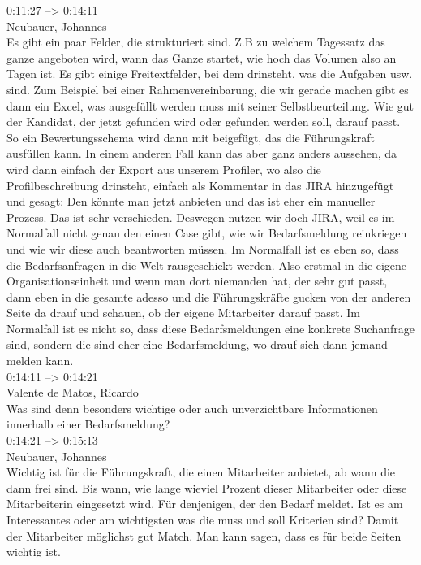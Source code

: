 0:11:27 --> 0:14:11\\
Neubauer, Johannes\\
Es gibt ein paar Felder, die strukturiert sind. Z.B zu welchem Tagessatz das ganze angeboten wird, wann das Ganze startet, wie hoch das Volumen also an Tagen ist. Es gibt einige Freitextfelder, bei dem drinsteht, was die Aufgaben usw. sind. Zum Beispiel bei einer Rahmenvereinbarung, die wir gerade machen gibt es dann ein Excel, was ausgefüllt werden muss mit seiner Selbstbeurteilung. Wie gut der Kandidat, der jetzt gefunden wird oder gefunden werden soll, darauf passt. So ein Bewertungsschema wird dann mit beigefügt, das die Führungskraft ausfüllen kann. In einem anderen Fall kann das aber ganz anders aussehen, da wird dann einfach der Export aus unserem Profiler, wo also die Profilbeschreibung drinsteht, einfach als Kommentar in das JIRA hinzugefügt und gesagt: Den könnte man jetzt anbieten und das ist eher ein manueller Prozess. Das ist sehr verschieden. Deswegen nutzen wir doch JIRA, weil es im Normalfall nicht genau den einen Case gibt, wie wir Bedarfsmeldung reinkriegen und wie wir diese auch beantworten müssen. Im Normalfall ist es eben so, dass die Bedarfsanfragen in die Welt rausgeschickt werden. Also erstmal in die eigene Organisationseinheit und wenn man dort niemanden hat, der sehr gut passt, dann eben in die gesamte adesso und die Führungskräfte gucken von der anderen Seite da drauf und schauen, ob der eigene Mitarbeiter darauf passt. Im Normalfall ist es nicht so, dass diese Bedarfsmeldungen eine konkrete Suchanfrage sind, sondern die sind eher eine Bedarfsmeldung, wo drauf sich dann jemand melden kann.\\

0:14:11 --> 0:14:21\\
Valente de Matos, Ricardo\\
Was sind denn besonders wichtige oder auch unverzichtbare Informationen innerhalb einer Bedarfsmeldung?\\

0:14:21 --> 0:15:13\\
Neubauer, Johannes\\
Wichtig ist für die Führungskraft, die einen Mitarbeiter anbietet, ab wann die dann frei sind. Bis wann, wie lange wieviel Prozent dieser Mitarbeiter oder diese Mitarbeiterin eingesetzt wird. Für denjenigen, der den Bedarf meldet. Ist es am Interessantes oder am wichtigsten was die muss und soll Kriterien sind? Damit der Mitarbeiter möglichst gut Match. Man kann sagen, dass es für beide Seiten wichtig ist.\\

